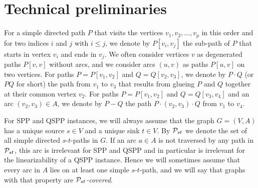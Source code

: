 \documentclass[runningheads]{llncs}
\begin{document}
\section{Technical preliminaries}
\label{sec:preliminearies}
For a simple directed path $P$ that visits the vertices $v_1,v_2,\ldots,v_p$ in this order and 
for two indices $i$ and $j$ with $i\le j$, we denote by $P[v_i,v_j]$ the 
sub-path of $P$ that starts in vertex $v_i$ and ends in $v_j$.
We often consider vertices $v$ as degenerated paths $P[v,v]$ without arcs,
and we consider arcs $(u,v)$ as paths $P[u,v]$ on two vertices.
For paths $P=P[v_1,v_2]$ and $Q=Q[v_2,v_3]$, we denote by $P\cdot Q$ (or $PQ$ for short) the path 
from $v_1$ to $v_3$ that results from glueing $P$ and $Q$ together at their common vertex $v_2$.
For paths $P=P[v_1,v_2]$ and $Q=Q[v_3,v_4]$ and an arc $(v_2,v_3)\in A$, we denote by $P-Q$ 
the path $P\cdot(v_2,v_3)\cdot Q$ from $v_1$ to $v_4$.

For SPP and QSPP instances, we will always assume that the graph $G=(V,A)$ has a unique source $s\in V$ 
and a unique sink $t\in V$. 
By ${\cal P}_{st}$ we denote the set of all simple directed $s$-$t$-paths in $G$.
If an arc $a\in A$ is not traversed by any path in ${\cal P}_{st}$, this arc is irrelevant for
SPP and QSPP and in particular is irrelevant for the linearizability of a QSPP instance.
Hence we will sometimes assume that every arc in $A$ lies on at least one simple $s$-$t$-path,
and we will say that graphs with that property are \emph{${\cal P}_{st}$-covered}.


\end{document}
